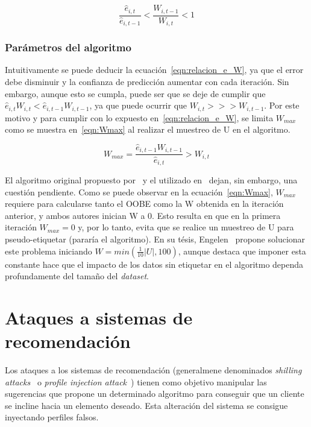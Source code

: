 \begin{equation}\label{eqn:relacion_e_W} \frac{\hat{e}_{i,t}}{\widehat{e}_{i, t-1}} < \frac{W_{i,t-1}}{W_{i,t}} < 1 \end{equation} 


\subsubsection{Parámetros del algoritmo}

Intuitivamente se puede deducir la ecuación~\ref{eqn:relacion_e_W}, ya que el error debe disminuir y la confianza de predicción aumentar con cada iteración. Sin embargo, aunque esto se cumpla, puede ser que se deje de cumplir que $\hat{e}_{i,t}W_{i,t} < \hat{e}_{i,t-1}W_{i,t-1}$, ya que puede ocurrir que $ W_{i,t} >>> W_{i,t-1}$. Por este motivo y para cumplir con lo expuesto en~\ref{eqn:relacion_e_W}, se limita $W_{max}$ como se muestra en~\ref{eqn:Wmax} al realizar el muestreo de U en el algoritmo.

\begin{equation}\label{eqn:Wmax} W_{max} = \frac{\hat{e}_{i,t-1}W_{i,t-1}}{\hat{e}_{i, t}} > W_{i,t} \end{equation}


\label{parag:Wmax_inicial} El algoritmo original propuesto por~\cite{originalCoForest2007} y el utilizado en~\cite{zhou2021SemisupervisedRecommendationAttack} dejan, sin embargo, una cuestión pendiente. Como se puede observar en la ecuación~\ref{eqn:Wmax}, $W_{max}$ requiere para calcularse tanto el OOBE como la W obtenida en la iteración anterior, y ambos autores inician W a 0. Esto resulta en que en la primera iteración $W_{max} = 0$ y, por lo tanto, evita que se realice un muestreo de U para pseudo-etiquetar (pararía el algoritmo). En su tésis, Engelen~\cite{engelen2018thesis} propone solucionar este problema iniciando $W = min(\frac{1}{10}|U|, 100)$, aunque destaca que imponer esta constante hace que el impacto de los datos sin etiquetar en el algoritmo dependa profundamente del tamaño del \textit{dataset}.

\section{Ataques a sistemas de recomendación}

Los ataques a los sistemas de recomendación (generalmene denominados \textit{shilling attacks}~\cite{mingdan2018ShillingAttacksAReview} o \textit{profile injection attack}~\cite{Mobasher2006Thesis}) tienen como objetivo manipular las sugerencias que propone un determinado algoritmo para conseguir que un cliente se incline hacia un elemento deseado. Esta alteración del sistema se consigue inyectando perfiles falsos.

